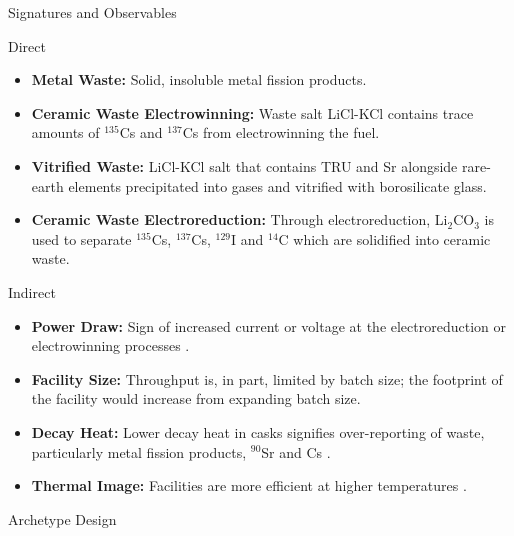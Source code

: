 \documentclass[final]{beamer}
\newlength{\onecolwid}
\newlength{\threecolwid}
\begin{document}
\begin{frame}[t]
\begin{columns}[t,totalwidth=\threecolwid]
\begin{column}{\onecolwid}
\begin{block}{Signatures and Observables}
\begin{block}{Direct}	
	\begin{itemize}
		\item \textbf{Metal Waste:} Solid, insoluble metal fission products.
		\item \textbf{Ceramic Waste Electrowinning:} Waste salt LiCl-KCl contains trace amounts of $^{135}$Cs and $^{137}$Cs from
		electrowinning the fuel.
		\item \textbf{Vitrified Waste:} LiCl-KCl salt that contains TRU and Sr alongside rare-earth elements precipitated into gases
		and vitrified with borosilicate glass.
		\item \textbf{Ceramic Waste Electroreduction:} Through electroreduction, Li$_2$CO$_3$ is used to separate $^{135}$Cs, $^{137}$Cs, 
		$^{129}$I and $^{14}$C which are solidified into ceramic waste.
	\end{itemize}
\end{block}
\begin{block}{Indirect}		
	\begin{itemize}
		\item \textbf{Power Draw:} Sign of increased current or voltage at the electroreduction or electrowinning processes \cite{Yilmaz_2016,Hou_2016,lee_advanced_nodate,koyama_development_2012}.
		\item \textbf{Facility Size:} Throughput is, in part, limited by batch size; the footprint of the facility would
		increase from expanding batch size.
		\item \textbf{Decay Heat:} Lower decay heat in casks signifies over-reporting of waste, particularly metal fission products, $^{90}$Sr and Cs \cite{flowsheet_1998,Borrelli_2017,lee_korean_2011}.
		\item \textbf{Thermal Image:} Facilities are more efficient at higher temperatures \cite{chapman_revision_1984,flowsheet_1998}.
	\end{itemize}
\end{block}
\end{block}

    

\begin{block}{Archetype Design}


\end{block}
\end{column}
\end{columns}
\end{frame}
\end{document}
